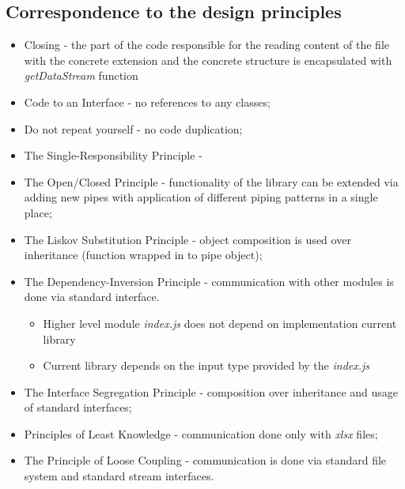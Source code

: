 \subsection{Correspondence to the design principles}
\begin{itemize}
	\item Closing - the part of the code responsible for the reading content of the file with the concrete extension and the concrete structure is encapsulated with \textit{getDataStream} function
	\item Code to an Interface - no references to any classes;%
	\item Do not repeat yourself - no code duplication;
	\item The Single-Responsibility Principle - %
	\item The Open/Closed Principle - functionality of the library can be extended via adding new pipes with application of different piping patterns in a single place;
	\item The Liskov Substitution Principle - object composition is used over inheritance (function wrapped in to pipe object);
	\item The Dependency-Inversion Principle - communication with other modules is done via standard interface.
		\begin{itemize}
			\item Higher level module \textit{index.js} does not depend on implementation current library
			\item Current library depends on the input type provided by the \textit{index.js}
		\end{itemize}
	\item The Interface Segregation Principle - composition over inheritance and usage of standard interfaces;
	\item Principles of Least Knowledge - communication done only with \textit{xlsx} files;
	\item The Principle of Loose Coupling - communication is done via standard file system and standard stream interfaces.
\end{itemize}
